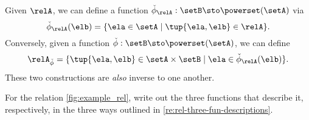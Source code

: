 \begin{remark}
\begin{enumerate}
Given $\relA$, we can define a function $\check \phi_{\relA} : \setB \sto \powerset (\setA)$ via 
\begin{equation}
\check \phi_{\relA} (\elb) = \{ \ela \in \setA \mid \tup{\ela, \elb} \in \relA \}. 
\end{equation}
Conversely, given a function $\check \phi : \setB \sto \powerset (\setA)$, we can define 
\begin{equation}
\relA_{\check \phi} = \{ \tup{\ela, \elb} \in \setA \times \setB \mid \ela \in \check \phi_{\relA}(\elb)   \}.
\end{equation}
These two constructions are \emph{also} inverse to one another. 
\end{enumerate}
\end{remark}

\begin{gradedexercise}\label{ex:Rel3Functions}
For the relation \cref{fig:example_rel}, write out the three functions that describe it, respectively, in the three ways outlined in \cref{re:rel-three-fun-descriptions}. 
\end{gradedexercise}
